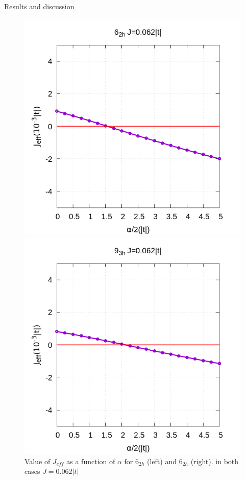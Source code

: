 \documentclass[12pt,twoside]{report}
\begin{document}
\begin{chapter}{Results and discussion}
	\begin{figure}[h!]
		\centering
		\hspace{-2cm}
		\begin{minipage}{0.4\textwidth}
			\includegraphics[scale=0.35]{Jeff_vs_xrep_ar2.png}
		\end{minipage}
		\hspace{2cm}
		\begin{minipage}{0.4\textwidth}
			\includegraphics[scale=0.35]{Jeff_vs_xrep_ar3.png}
		\end{minipage}
		\caption{\label{fig_arxrep} Value of $J_{eff}$ as a function of $\alpha$ for 6$_{2h}$ (left) and 6$_{2h}$ (right). in both cases $J=0.062 |t|$ }
	\end{figure}


\end{chapter}
\end{document}
